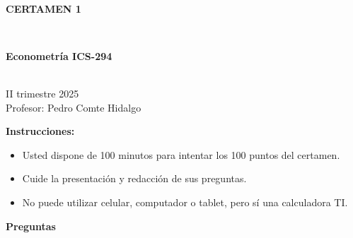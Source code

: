\documentclass[10pt,a4paper]{article}
\begin{document}
\vspace{5cm}



\begin{center}
\begin{large}
\textbf{\\CERTAMEN 1}
\end{large}\\
\end{center}

\begin{center}
\begin{large}
\textbf{Econometría ICS-294}
\end{large}\\
\vspace{0.2cm}
II trimestre 2025\\
Profesor: Pedro Comte Hidalgo\\
\end{center}

\textbf{Instrucciones:} 

\begin{itemize}

    \item Usted dispone de 100 minutos  para intentar los 100 puntos del certamen.
    \item Cuide la presentación y redacción de sus preguntas.
    \item No puede utilizar celular, computador o tablet, pero sí una calculadora TI.
     
\end{itemize}

\textbf{Preguntas}
\end{document}
